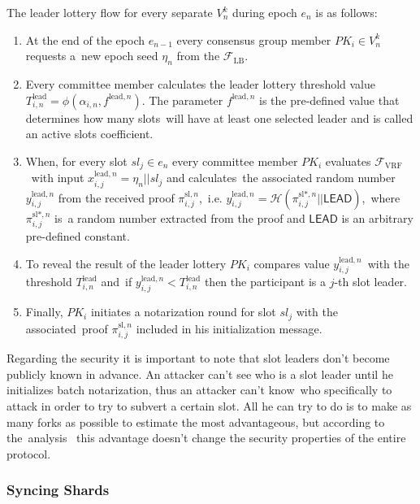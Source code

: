 The leader lottery flow for every separate $V_n^k$ during epoch $e_n$ is as follows:
\begin{enumerate}
    \item At the end of the epoch $e_{n-1}$ every consensus group member $PK_i \in V_n^k$ requests a\
    new epoch seed $\eta_n$ from the ${\mathcal{F}}_{\text{LB}}$.
    \item Every committee member calculates the leader lottery threshold value\
    $T_{i, n}^{\text{lead}} = \phi(\alpha_{i, n}, f^{\text{lead}, n})$.
    The parameter $f^{\text{lead}, n}$ is the pre-defined value that determines how many slots\
    will have at least one selected leader and is called an active slots coefficient.
    \item When, for every slot $sl_j \in e_n$ every committee member $PK_i$ evaluates ${\mathcal{F}}_{\text{VRF}}$\
    with input $x_{i, j}^{\text{lead}, n} = \eta_n || sl_j $ and calculates\
    the associated random number $y_{i, j}^{\text{lead}, n}$ from the received proof $\pi_{i, j}^{\text{sl}, n}$,\
    i.e. ${y_{i, j}^{\text{lead}, n} = \mathcal{H}(\pi_{i, j}^{\text{sl}*, n}||\textsf{LEAD})}$,\
    where $\pi_{i, j}^{\text{sl}*, n}$ is\
    a random number extracted from the proof and $\textsf{LEAD}$ is an arbitrary pre-defined constant.
    \item To reveal the result of the leader lottery $PK_i$ compares value $y_{i, j}^{\text{lead}, n}$\
    with the threshold $T_{i, n}^{\text{lead}}$ and\
    if ${y_{i, j}^{\text{lead}, n} < T_{i, n}^{\text{lead}}}$ then the participant is a $j$-th slot leader.\
    \item Finally, $PK_i$ initiates a notarization round for slot $sl_j$ with the associated\
    proof $\pi_{i, j}^{\text{sl}, n}$ included in his initialization message.
\end{enumerate}

Regarding the security it is important to note that slot leaders don't become publicly known in advance.
An attacker can't see who is a slot leader until he initializes batch notarization, thus an attacker can't know\
who specifically to attack in order to try to subvert a certain slot.
All he can try to do is to make as many forks as possible to estimate the most advantageous, but according to the\
analysis~\cite{cryptoeprint:2017/573} this advantage doesn't change the security properties of the entire protocol.

\subsubsection{Syncing Shards}\label{subsubsec:syncing-shards}

